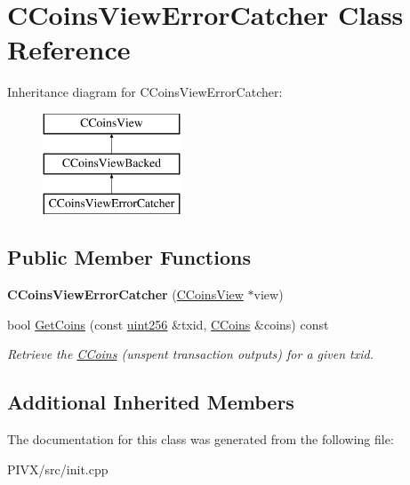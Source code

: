 \hypertarget{class_c_coins_view_error_catcher}{}\section{C\+Coins\+View\+Error\+Catcher Class Reference}
\label{class_c_coins_view_error_catcher}
Inheritance diagram for C\+Coins\+View\+Error\+Catcher\+:\begin{figure}[H]
\begin{center}
\leavevmode
\includegraphics[height=3.000000cm]{class_c_coins_view_error_catcher}
\end{center}
\end{figure}
\subsection*{Public Member Functions}
\begin{DoxyCompactItemize}
\item 
\mbox{\label{class_c_coins_view_error_catcher_aa8295e2f5ce5ad9880c5bd86d52e014c}} 
{\bfseries C\+Coins\+View\+Error\+Catcher} (\mbox{\hyperlink{class_c_coins_view}{C\+Coins\+View}} $\ast$view)
\item 
\mbox{\label{class_c_coins_view_error_catcher_a909f7b9e364b6f06bfea955209aa015d}} 
bool \mbox{\hyperlink{class_c_coins_view_error_catcher_a909f7b9e364b6f06bfea955209aa015d}{Get\+Coins}} (const \mbox{\hyperlink{classuint256}{uint256}} \&txid, \mbox{\hyperlink{class_c_coins}{C\+Coins}} \&coins) const
\begin{DoxyCompactList}\small\item\em Retrieve the \mbox{\hyperlink{class_c_coins}{C\+Coins}} (unspent transaction outputs) for a given txid. \end{DoxyCompactList}\end{DoxyCompactItemize}
\subsection*{Additional Inherited Members}


The documentation for this class was generated from the following file\+:\begin{DoxyCompactItemize}
\item 
P\+I\+V\+X/src/init.\+cpp\end{DoxyCompactItemize}
